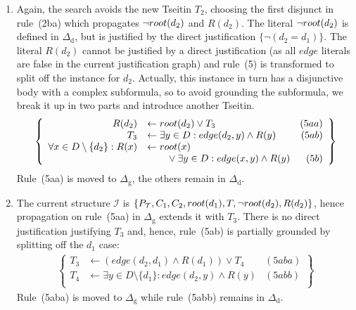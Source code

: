 \documentclass[11pt]{article}
\newcommand{\m}[1]{\ensuremath{#1}\xspace}
\newcommand{\lrule}{\m{\leftarrow}}
\newcommand{\I}{\m{\mathcal{I}}}
\newcommand{\theory}{\m{\mathcal{T}}}
\newcommand{\D}{\m{\Delta}}
\newcommand{\typed}[2]{\m{#1\in #2:}}
\theoremstyle{plain}
\theoremstyle{definition}
\theoremstyle{example_basic}
\theoremstyle{example_contd}
\theoremstyle{plain}
\newcommand{\Dg}{\ensuremath{\D_\text{g}}\xspace}
\newcommand{\Dd}{\ensuremath{\D_\text{d}}\xspace}
\newcommand{\pt}{\ensuremath{P_\text{\theory}}\xspace}
\newcommand{\change}[1]{#1}
\begin{document}
\begin{enumerate}
\item Again, the search avoids the new Tseitin $T_2$, choosing the first
  disjunct in rule~(2ba) which propagates $\lnot root(d_2)$ and $R(d_2)$. The literal $\lnot root(d_2)$ is defined in \Dd, but is justified by the direct justification $\{\lnot (d_2=d_1)\}$. The literal $R(d_2)$ cannot be justified \change{by a direct justification} (as all $edge$ literals are false in the current justification graph) and rule~(5) is transformed to split off the instance for $d_2$. Actually, this instance in turn has a disjunctive body with a complex subformula, so to avoid grounding the subformula, we break it up in two parts and introduce another Tseitin.
  \[\begin{array}{c}
    \left\{\begin{array}{rlr}
        R(d_2) & \lrule \rt(d_2) \lor T_3   & (5aa) \\
        T_3 & \lrule \exists \typed{y}{D} edge(d_2,y)\land R(y)  & (5ab)\\
        \forall \typed{x}{D\setminus \{d_2\}} R(x)&\lrule \rt(x) &\\
        	&\qquad {} \lor \exists \typed{y}{D} edge(x,y)\land R(y) & (5b)
      \end{array}\right\}
  \end{array}\]
  Rule~(5aa)  is moved to $\Dg$, the others remain in $\Dd$.

\item The current structure \I is $\{ \pt, C_1, C_2, \rt(d_1), T,
  \lnot\rt(d_2), R(d_2) \}$, hence propagation on rule~(5aa) in \Dg extends it
  with $T_3$. There is no direct justification justifying $T_3$ and, hence, rule~(5ab) is partially grounded by splitting off the $d_1$ case:
  \[\begin{array}{c}
    \left\{\begin{array}{rlr}
        T_3 & \lrule (edge(d_2,d_1)\land R(d_1)) \lor T_4 & (5aba)\\
        T_4 & \lrule \exists \typed{y}{D\setminus  \{d_1\}} edge(d_2,y)\land R(y)  & (5abb)\\
      \end{array}\right\}
  \end{array}\]
Rule~(5aba) is moved to \Dg while rule~(5abb) remains in \Dd.


\end{enumerate}
\end{document}
